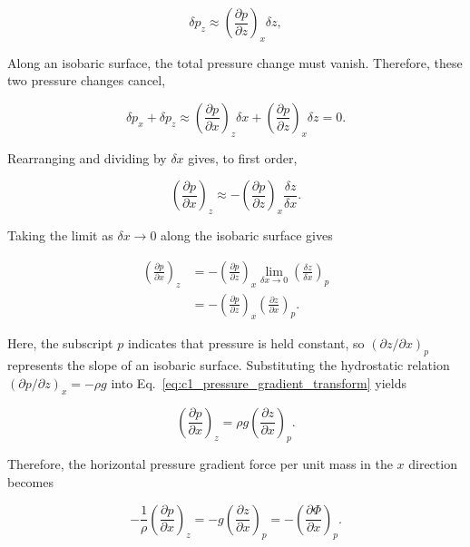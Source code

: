 \documentclass[10pt,twocolumn]{memoir}
\begin{document}
\begin{equation}
    \delta p_z \approx \left(\frac{\partial p}{\partial z}\right)_x\delta z,
\end{equation}

Along an isobaric surface, the total pressure change must vanish. Therefore, these two pressure changes cancel,

\begin{equation}
    \delta p_x+\delta p_z\approx
    \left(\frac{\partial p}{\partial x}\right)_z\delta x + \left(\frac{\partial p}{\partial z}\right)_x\delta z=0.
\end{equation}

Rearranging and dividing by $\delta x$ gives, to first order,

\begin{equation}
    \left(\frac{\partial p}{\partial x}\right)_z \approx-\left(\frac{\partial p}{\partial z}\right)_x \frac{\delta z}{\delta x}.
\end{equation}

Taking the limit as $\delta x\to0$ along the isobaric surface gives

\begin{equation}
\begin{aligned}
    \left(\frac{\partial p}{\partial x}\right)_z
    &= -\left(\frac{\partial p}{\partial z}\right)_x
    \lim_{\delta x\to0}\left(\frac{\delta z}{\delta x}\right)_p\\
    &= -\left(\frac{\partial p}{\partial z}\right)_x \left(\frac{\partial z}{\partial x}\right)_p.
\end{aligned}
\label{eq:c1_pressure_gradient_transform}
\end{equation}

Here, the subscript $p$ indicates that pressure is held constant, so $(\partial z/\partial x)_p$ represents the slope of an isobaric surface. Substituting the hydrostatic relation $(\partial p/\partial z)_x=-\rho g$ into Eq.~\ref{eq:c1_pressure_gradient_transform} yields

\begin{equation}
    \left(\frac{\partial p}{\partial x}\right)_z
    =\rho g\left(\frac{\partial z}{\partial x}\right)_p.
\end{equation}

Therefore, the horizontal pressure gradient force per unit mass in the $x$ direction becomes

\begin{equation}
    -\frac{1}{\rho}\left(\frac{\partial p}{\partial x}\right)_z
    =-g\left(\frac{\partial z}{\partial x}\right)_p
    =-\left(\frac{\partial\Phi}{\partial x}\right)_p.
\label{eq:c1_pgf_pressure_x}
\end{equation}
\end{document}
